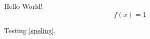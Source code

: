 \documentclass{minimal}
\begin{document}
Hello World!
\begin{equation}
  f(x) = 1
  \label{speling}
\end{equation}

Testing \cref{speling}.


\end{document}

